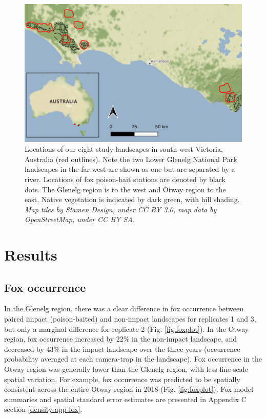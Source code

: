 \documentclass[11pt,a4paper,titlepage,twoside,openright]{style/unimelbthesis}
\begin{document}
\begin{mainmatter}
\(~\)

\(~\)
\begin{figure}

{\centering \includegraphics[width=1\linewidth]{figure/map_density} 

}

\caption{Locations of our eight study landscapes in south-west Victoria, Australia (red outlines). Note the two Lower Glenelg National Park landscapes in the far west are shown as one but are separated by a river. Locations of fox poison-bait stations are denoted by black dots. The Glenelg region is to the west and Otway region to the east. Native vegetation is indicated by dark green, with hill shading. \textit{Map tiles by Stamen Design, under CC BY 3.0, map data by OpenStreetMap, under CC BY SA.}}\label{fig:density-map}
\end{figure}
\newpage

\hypertarget{results-2}{%
\section{Results}\label{results-2}}

\hypertarget{fox-occurrence}{%
\subsection{Fox occurrence}\label{fox-occurrence}}

In the Glenelg region, there was a clear difference in fox occurrence between paired impact (poison-baited) and non-impact landscapes for replicates 1 and 3, but only a marginal difference for replicate 2 (Fig. \ref{fig:foxplot}). In the Otway region, fox occurrence increased by 22\% in the non-impact landscape, and decreased by 43\% in the impact landscape over the three years (occurrence probability averaged at each camera-trap in the landscape). Fox occurrence in the Otway region was generally lower than the Glenelg region, with less fine-scale spatial variation. For example, fox occurrence was predicted to be spatially consistent across the entire Otway region in 2018 (Fig. \ref{fig:foxplot}). Fox model summaries and spatial standard error estimates are presented in Appendix C section \ref{density-app-fox}.


\end{mainmatter}
\end{document}
